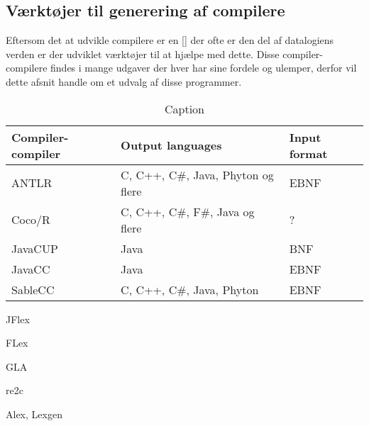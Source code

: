\subsection{Værktøjer til generering af compilere}

Eftersom det at udvikle compilere er en [] der ofte er den del af datalogiens verden er der udviklet værktøjer til at hjælpe med dette. Disse compiler-compilere findes i mange udgaver der hver har sine fordele og ulemper, derfor vil dette afsnit handle om et udvalg af disse programmer.

\begin{table}[H]
\centering
\footnotesize
\begin{tabular}{l l l}
\toprule
\textbf{Compiler-compiler}  &\textbf{Output languages}              &\textbf{Input format}  \\\midrule
ANTLR                       & C, C++, C\#, Java, Phyton og flere    & EBNF                  \\
Coco/R                      & C, C++, C\#, F\#, Java og flere       & ?                     \\
JavaCUP                     & Java                                  & BNF                   \\
JavaCC                      & Java                                  & EBNF                  \\
SableCC                     & C, C++, C\#, Java, Phyton             & EBNF                  \\\bottomrule
\end{tabular}
\caption{Caption}
\label{tab:my_label}
\end{table}

JFlex

FLex

GLA

re2c

Alex, Lexgen
